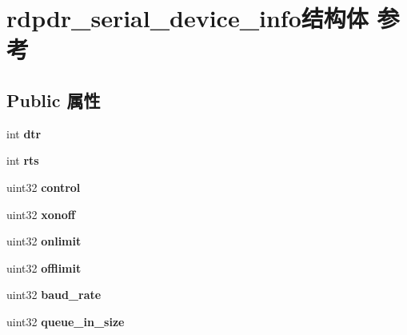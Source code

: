 \hypertarget{structrdpdr__serial__device__info}{}\section{rdpdr\+\_\+serial\+\_\+device\+\_\+info结构体 参考}
\label{structrdpdr__serial__device__info}
\subsection*{Public 属性}
\begin{DoxyCompactItemize}
\item 
\mbox{\label{structrdpdr__serial__device__info_aca66a07fbd34e72e249afa8f1437b5f9}} 
int {\bfseries dtr}
\item 
\mbox{\label{structrdpdr__serial__device__info_ae2b83e48d33875a42f37cbd498af80da}} 
int {\bfseries rts}
\item 
\mbox{\label{structrdpdr__serial__device__info_a68b95d32728c2e6113d4601008b75ec7}} 
uint32 {\bfseries control}
\item 
\mbox{\label{structrdpdr__serial__device__info_a800d3804ba112c0095e2f600d45766e1}} 
uint32 {\bfseries xonoff}
\item 
\mbox{\label{structrdpdr__serial__device__info_a89be2fc0ca39267a36f490b3f93a6cfa}} 
uint32 {\bfseries onlimit}
\item 
\mbox{\label{structrdpdr__serial__device__info_a75c46981a1d8a720a6583986b95747e8}} 
uint32 {\bfseries offlimit}
\item 
\mbox{\label{structrdpdr__serial__device__info_afa32fb9cf1629b569f5bfd833c12a7de}} 
uint32 {\bfseries baud\+\_\+rate}
\item 
\mbox{\label{structrdpdr__serial__device__info_aa95833cd59c3351759c54d8fca122c84}} 
uint32 {\bfseries queue\+\_\+in\+\_\+size}
\item 

\end{DoxyCompactItemize}
